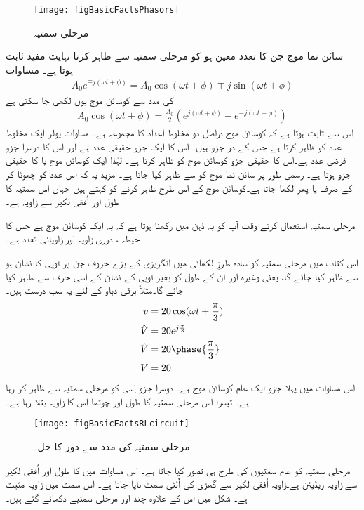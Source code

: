\begin{figure}
\centering
\texttt{[image: figBasicFactsPhasors]}
\caption{مرحلی سمتیہ}
\label{شکل_حقائق_دوری_سمتیات}
\end{figure}
سائن نما موج جن کا تعدد معین ہو کو مرحلی سمتیہ سے ظاہر کرنا نہایت مفید ثابت ہوتا ہے۔ مساوات 
\begin{align}
A_0 e^{\mp j (\omega t + \phi)}=A_0 \cos (\omega t +\phi) \mp j \sin (\omega t+\phi)
\end{align}
کی مدد سے کوسائن موج یوں لکھی جا سکتی ہے
\begin{align}
A_0 \cos (\omega t +\phi)=\frac{A_0}{2} \left(e^{j(\omega t +\phi)} -e^{-j(\omega t +\phi)}\right)
\end{align}
اس سے ثابت ہوتا ہے کہ کوسائن موج دراصل دو مخلوط اعداد کا مجموعہ ہے۔ مساوات یولر ایک مخلوط عدد کو ظاہر کرتا ہے جس کے دو جزو ہیں۔ اس کا ایک جزو حقیقی عدد ہے اور اس کا دوسرا جزو فرضی عدد ہے۔اس کا حقیقی جزو کوسائن موج کو ظاہر کرتا ہے۔ لہٰذا ایک کوسائن موج   یا  کا حقیقی جزو ہوتا ہے۔ رسمی طور پر سائن نما موج کو  سے ظاہر کیا جاتا ہے۔ مزید یہ کہ اس عدد کو چھوٹا کر کے صرف  یا پھر  لکھا جاتا ہے۔کوسائن موج کے اس طرح ظاہر کرنے کو  کہتے ہیں جہاں اس سمتیہ کا طول  اور اُفقی لکیر سے زاویہ  ہے۔

	 مرحلی سمتیہ استعمال کرتے وقت آپ کو یہ ذہن میں رکھنا ہوتا ہے کہ یہ ایک کوسائن موج ہے جس کا حیطہ   ، دوری زاویہ  اور زاویائی تعدد  ہے۔

اس کتاب میں مرحلی سمتیہ کو سادہ طرزِ لکھائی میں انگریزی کے بڑے حروف جن پر ٹوپی کا نشان ہو سے ظاہر کیا جائے گا، یعنی   وغیرہ اور ان کے طول کو بغیر ٹوپی کے نشان کے اسی حرف سے ظاہر کیا جائے گا۔مثلاً برقی دباو  کے لئے یہ سب درست ہیں۔
\begin{gather}
\begin{aligned}
v&=20 \cos (\omega t +\frac{\pi}{3})\\
\hat{V}&=20 e^{j \frac{\pi}{3}}\\
\hat{V}&=20 \phase{\frac{\pi}{3}}\\
V&=20
\end{aligned}
\end{gather}
اس مساوات میں پہلا جزو ایک عام کوسائن موج ہے۔ دوسرا جزو اِسی کو مرحلی سمتیہ سے ظاہر کر رہا ہے۔ تیسرا اس مرحلی سمتیہ کا طول اور چوتھا اس کا زاویہ بتلا رہا ہے۔
\begin{figure}
\centering
\texttt{[image: figBasicFactsRLcircuit]}
\caption{مرحلی سمتیہ کی مدد سے  دور کا حل۔}
\label{شکل_حقائق_دوری_سمتیہ_سے_دور_حل}
\end{figure}
	مرحلی سمتیہ کو عام سمتیوں کی طرح ہی تصور کیا جاتا ہے۔ اس مساوات میں  کا طول  اور اُفقی لکیر سے زاویہ   ریڈیئن ہے۔زاویہ اُفقی لکیر سے گھڑی کی اُلٹی سمت ناپا جاتا ہے۔ اس سمت میں زاویہ مثبت ہے۔ شکل  میں اس  کے علاوہ چند اور مرحلی سمتیے دکھائے گئے ہیں۔

